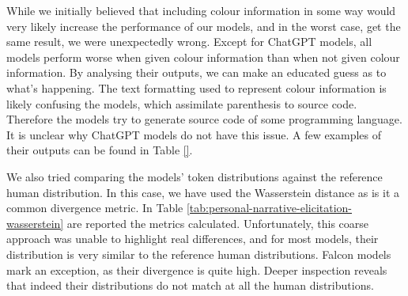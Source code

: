 While we initially believed that including colour information in some way would very likely increase the performance of our models, and in the worst case, get the same result, we were unexpectedly wrong. Except for ChatGPT models, all models perform worse when given colour information than when not given colour information. By analysing their outputs, we can make an educated guess as to what's happening. The text formatting used to represent colour information is likely confusing the models, which assimilate parenthesis to source code. Therefore the models try to generate source code of some programming language. It is unclear why ChatGPT models do not have this issue. A few examples of their outputs can be found in Table \ref{}.


We also tried comparing the models' token distributions against the reference human distribution. In this case, we have used the Wasserstein distance \cite{} as is it a common divergence metric. In Table \ref{tab:personal-narrative-elicitation-wasserstein} are reported the metrics calculated. Unfortunately, this coarse approach was unable to highlight real differences, and for most models, their distribution is very similar to the reference human distributions. Falcon models mark an exception, as their divergence is quite high. Deeper inspection reveals that indeed their distributions do not match at all the human distributions. 
